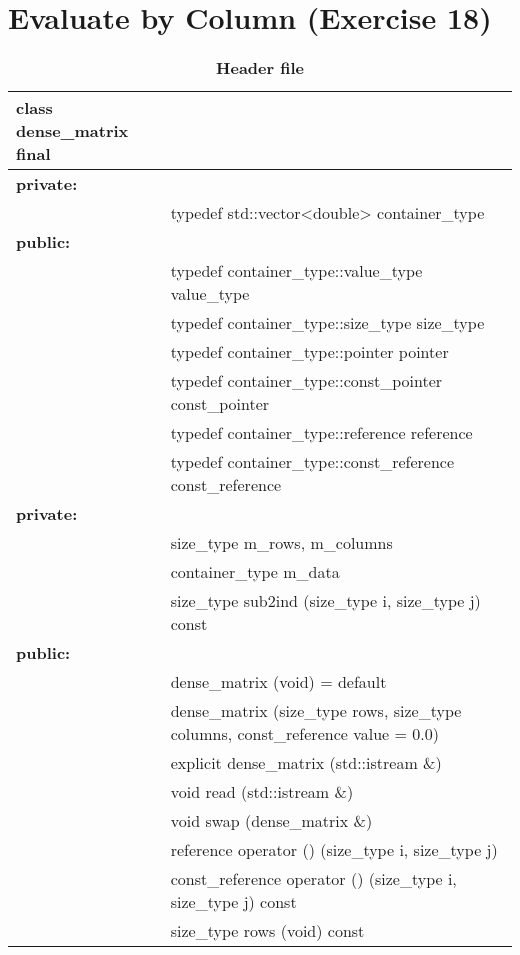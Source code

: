 
\chapter{Evaluate by Column (Exercise 18)}
\thispagestyle{empty}

\begin{table}[H]
    \caption*{\textbf{Header file}}
    \centering 
    \begin{tabular}{ll}
    \hline
    \rowcolor{bluepoli!40} %
    class dense\_matrix final & \\
    \hline
    \textbf{private:} & \\
    & typedef std::vector<double> container\_type \\
    \hline
    \textbf{public:} & \\
    & typedef container\_type::value\_type value\_type \\
    & typedef container\_type::size\_type size\_type \\
    & typedef container\_type::pointer pointer \\
    & typedef container\_type::const\_pointer const\_pointer \\
    & typedef container\_type::reference reference \\
    & typedef container\_type::const\_reference const\_reference \\
    \hline
    \textbf{private:} & \\
    & size\_type m\_rows, m\_columns \\
    & container\_type m\_data \\
    & size\_type sub2ind (size\_type i, size\_type j) const \\
    \hline
    \textbf{public:} & \\
    & dense\_matrix (void) = default \\
    & dense\_matrix (size\_type rows, size\_type columns, const\_reference value = 0.0) \\
    & explicit dense\_matrix (std::istream \&) \\
    & void read (std::istream \&) \\
    & void swap (dense\_matrix \&) \\
    & reference operator () (size\_type i, size\_type j) \\
    & const\_reference operator () (size\_type i, size\_type j) const \\
    & size\_type rows (void) const \\

\end{tabular}
\end{table}
